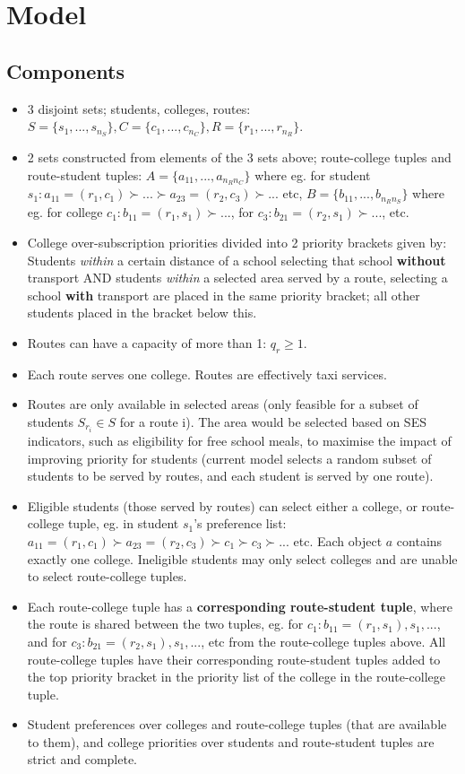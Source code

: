 \documentclass[runningheads]{llncs}
\begin{document}
\section{Model}
\subsection{Components}
\begin{itemize}
    \item 3 disjoint sets; students, colleges, routes:
    \subitem $S = \{s_1,...,s_{n_S}\}, C = \{c_1,...,c_{n_C}\}, R = \{r_1,...,r_{n_R}\}$.
    \item 2 sets constructed from elements of the 3 sets above; route-college tuples and route-student tuples:
    \subitem $A = \{a_{11},...,a_{n_R n_C}\}$ where eg. for student $s_1: a_{11} = (r_1,c_1) \succ ... \succ a_{23} = (r_2,c_3) \succ ...$ etc,
    \subitem $B = \{b_{11},...,b_{n_R n_S}\}$ where eg. for college $c_1: b_{11} = (r_1,s_1) \succ ...$, for $c_3: b_{21} = (r_2,s_1) \succ ...$, etc.
    \item College over-subscription priorities divided into 2 priority brackets given by:
    \subitem Students \textit{within} a certain distance of a school selecting that school \textbf{without} transport AND students \textit{within} a selected area served by a route, selecting a school \textbf{with} transport are placed in the same priority bracket; all other students placed in the bracket below this.
    \item Routes can have a capacity of more than 1: $q_r \geq 1$.
    \item Each route serves one college. Routes are effectively taxi services.
    \item Routes are only available in selected areas (only feasible for a subset of students $S_{r_i} \in S$ for a route i). The area would be selected based on SES indicators, such as eligibility for free school meals, to maximise the impact of improving priority for students (current model selects a random subset of students to be served by routes, and each student is served by one route).
    \item Eligible students (those served by routes) can select either a college, or route-college tuple, eg. in student $s_1$'s preference list: $a_{11} = (r_1,c_1) \succ a_{23} = (r_2,c_3) \succ c_1 \succ c_3 \succ ...$ etc. Each object $a$ contains exactly one college. Ineligible students may only select colleges and are unable to select route-college tuples.
    \item Each route-college tuple has a \textbf{corresponding route-student tuple}, where the route is shared between the two tuples, eg. for $c_1: b_{11} = (r_1,s_1), s_1, ...$, and for $c_3: b_{21} = (r_2,s_1), s_1, ...$, etc from the route-college tuples above. All route-college tuples have their corresponding route-student tuples added to the top priority bracket in the priority list of the college in the route-college tuple.
    \item Student preferences over colleges and route-college tuples (that are available to them), and college priorities over students and route-student tuples are strict and complete.
\end{itemize}
\end{document}
